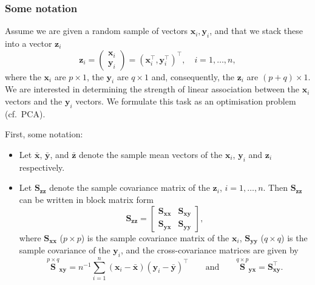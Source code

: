 \documentclass[]{book}
\theoremstyle{definition}
\theoremstyle{definition}
\theoremstyle{definition}
\theoremstyle{remark}
\begin{document}
\hypertarget{some-notation}{%
\subsubsection*{Some notation}\label{some-notation}}

Assume we are given a random sample of vectors \(\mathbf x_i, \mathbf y_i\), and that we stack these into a vector \(\mathbf z_i\)
\[
\mathbf z_i=\left(\begin{array}{c}
\mathbf x_i\\
\mathbf y_i
\end{array}\right)=(\mathbf x_i^\top , \mathbf y_i^\top )^\top,\quad  i=1,\ldots, n,
\]
where
the \(\mathbf x_i\) are \(p \times 1\), the \(\mathbf y_i\) are \(q \times 1\) and, consequently, the \(\mathbf z_i\) are \((p+q)\times 1\). We are interested in determining the strength of linear association between the \(\mathbf x_i\) vectors and the \(\mathbf y_i\) vectors.
We formulate this task as an optimisation problem (cf.~PCA).

First, some notation:

\begin{itemize}
\item
  Let \(\bar{\mathbf x}\), \(\bar{\mathbf y}\), and \(\bar{\mathbf z}\) denote the sample mean vectors of the \(\mathbf x_i\), \(\mathbf y_i\) and \(\mathbf z_i\) respectively.
\item
  Let \(\mathbf S_{\mathbf z\mathbf z}\) denote the sample covariance matrix of the \(\mathbf z_i\), \(i=1,\ldots, n\). Then \(\mathbf S_{\mathbf z\mathbf z}\) can be written in block matrix form
  \[
  \mathbf S_{\mathbf z\mathbf z}=\left [\begin{array}{cc}
  \mathbf S_{\mathbf x\mathbf x} & \mathbf S_{\mathbf x\mathbf y}\\
  \mathbf S_{\mathbf y\mathbf x} & \mathbf S_{\mathbf y\mathbf y} \end{array} \right ],
  \]
  where \(\mathbf S_{\mathbf x\mathbf x}\) (\(p \times p\)) is the sample covariance matrix of the \(\mathbf x_i\), \(\mathbf S_{\mathbf y\mathbf y}\) (\(q \times q\)) is the sample covariance of the \(\mathbf y_i\), and the cross-covariance matrices are given by
  \[
  \stackrel{p \times q}{\mathbf S}_{\mathbf x\mathbf y}=n^{-1} \sum_{i=1}^n (\mathbf x_i -\bar{\mathbf x})(\mathbf y_i-\bar{\mathbf y})^\top
  \qquad \text{and} \qquad \stackrel{q \times p}{\mathbf S}_{\mathbf y\mathbf x}=\mathbf S_{\mathbf x\mathbf y}^\top.
  \]
\end{itemize}
\end{document}
